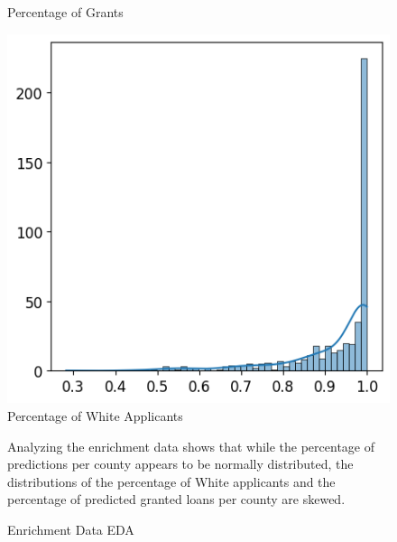 \begin{figure}[!htbp]
\begin{minipage}{0.33\textwidth}
        \small
        Percentage of Grants
    \end{minipage}\hfill
    \begin{minipage}{0.33\textwidth}
        \centering
        \includegraphics[width=\textwidth]{images/geo_enrich/white_per_county.png}
        \small
        Percentage of White Applicants
    \end{minipage}\hfill
    \caption{Enrichment Data EDA}
    \label{fig:Enrichment_Data_EDA}
    \medskip
    \small
    Analyzing the enrichment data shows that while the percentage of predictions per county appears to be normally distributed, the distributions of the percentage of White applicants and the percentage of predicted granted loans per county are skewed.
\end{figure}

\newpage

%
